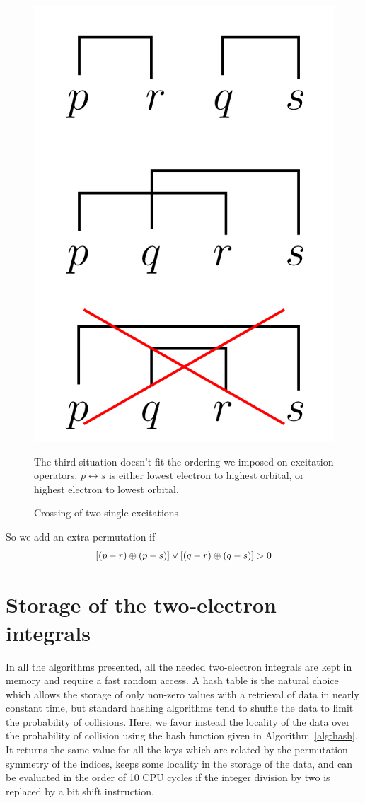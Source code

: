 \documentclass[./thesis.tex]{subfiles}
\begin{document}
\begin{figure}[h!]
	\begin{center}
		\includegraphics[width=0.4\columnwidth]{figures/determinant_driven/biphasefactor}
		\caption{
		\label{fig:biphasefactor}%
		Crossing of two single excitations
		}
		The third situation doesn't fit the ordering we imposed on excitation operators. $p \leftrightarrow s$ is either lowest electron to highest orbital, or highest electron to lowest orbital.
	\end{center}
\end{figure}

So we add an extra permutation if
\begin{equation}
[(p-r) \oplus (p-s)] \vee [(q-r) \oplus (q-s)] > 0
\end{equation}



\section{Storage of the two-electron integrals}

In all the algorithms presented, all the needed two-electron integrals are kept in memory
and require a fast random access.
A hash table is the natural choice which allows the storage of only non-zero
values with a retrieval of data in nearly constant time, but standard hashing
algorithms tend to shuffle the data to limit the probability of collisions.
Here, we favor instead the locality of the data over the probability of collision
using the hash function given in Algorithm~\ref{alg:hash}.  It returns the same
value for all the keys which are related by the permutation symmetry of the
indices, keeps some locality in the storage of the data, and can be evaluated
in the order of 10 CPU cycles if the integer division by two is replaced by a
bit shift instruction.
\end{document}
